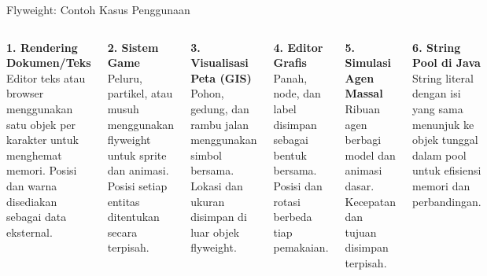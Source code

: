 \documentclass[aspectratio=169, table]{beamer}
\begin{document}
\begin{frame}{Flyweight: Contoh Kasus Penggunaan}
	\vspace{20pt}
	\begin{columns}[T]
		\textbf{1. Rendering Dokumen/Teks}\\
		Editor teks atau browser menggunakan satu objek per karakter untuk menghemat memori. Posisi dan warna disediakan sebagai data eksternal.
		
		\vspace{5pt}
		\textbf{2. Sistem Game}\\
		Peluru, partikel, atau musuh menggunakan flyweight untuk sprite dan animasi. Posisi setiap entitas ditentukan secara terpisah.
		
		\vspace{5pt}
		\textbf{3. Visualisasi Peta (GIS)}\\
		Pohon, gedung, dan rambu jalan menggunakan simbol bersama. Lokasi dan ukuran disimpan di luar objek flyweight.
		
		\textbf{4. Editor Grafis}\\
		Panah, node, dan label disimpan sebagai bentuk bersama. Posisi dan rotasi berbeda tiap pemakaian.
		
		\vspace{5pt}
		\textbf{5. Simulasi Agen Massal}\\
		Ribuan agen berbagi model dan animasi dasar. Kecepatan dan tujuan disimpan terpisah.
		
		\vspace{5pt}
		\textbf{6. String Pool di Java}\\
		String literal dengan isi yang sama menunjuk ke objek tunggal dalam pool untuk efisiensi memori dan perbandingan.
	\end{columns}
\end{frame}
\end{document}
